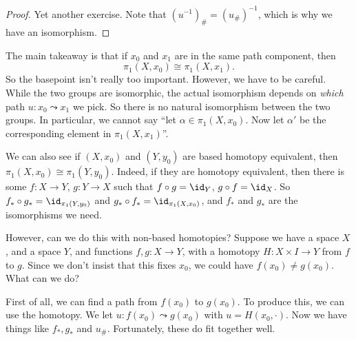 \documentclass[a4paper]{article}
\begin{document}
\begin{proof}
  Yet another exercise. Note that $(u^{-1})_\# = (u_\#)^{-1}$, which is why we have an isomorphism.
\end{proof}
The main takeaway is that if $x_0$ and $x_1$ are in the same path component, then
\[
  \pi_1(X, x_0) \cong \pi_1(X, x_1).
\]
So the basepoint isn't really too important. However, we have to be careful. While the two groups are isomorphic, the actual isomorphism depends on \emph{which} path $u: x_0 \leadsto x_1$ we pick. So there is no natural isomorphism between the two groups. In particular, we cannot say ``let $\alpha \in \pi_1(X, x_0)$. Now let $\alpha'$ be the corresponding element in $\pi_1(X, x_1)$''.

We can also see if $(X, x_0)$ and $(Y, y_0)$ are based homotopy equivalent, then $\pi_1(X, x_0)\cong \pi_1(Y, y_0)$. Indeed, if they are homotopy equivalent, then there is some $f: X \to Y$, $g: Y \to X$ such that $f\circ g = \id_Y$, $g\circ f = \id_X$. So $f_*\circ g_* = \id_{\pi_1(Y, y_0)}$ and $g_*\circ f_* = \id_{\pi_1(X, x_0)}$, and $f_*$ and $g_*$ are the isomorphisms we need.

However, can we do this with non-based homotopies? Suppose we have a space $X$, and a space $Y$, and functions $f, g: X \to Y$, with a homotopy $H: X\times I \to Y$ from $f$ to $g$. Since we don't insist that this fixes $x_0$, we could have $f(x_0) \not= g(x_0)$. What can we do?

First of all, we can find a path from $f(x_0)$ to $g(x_0)$. To produce this, we can use the homotopy. We let $u: f(x_0) \leadsto g(x_0)$ with $u = H(x_0, \cdot)$. Now we have things like $f_*, g_*$ and $u_\#$. Fortunately, these do fit together well.
\begin{center}
\end{center}
\end{document}
